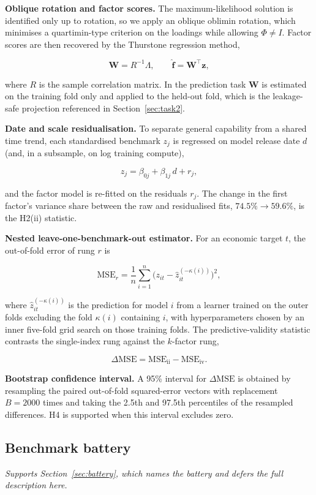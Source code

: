\medskip
\noindent\textbf{Oblique rotation and factor scores.}
The maximum-likelihood solution is identified only up to rotation, so we apply an oblique oblimin
rotation, which minimises a quartimin-type criterion on the loadings while allowing $\Phi\neq I$. Factor
scores are then recovered by the Thurstone regression method,

\[
  \mathbf{W} = R^{-1}\Lambda, \qquad \hat{\mathbf{f}} = \mathbf{W}^{\top}\mathbf{z},
\]

where $R$ is the sample correlation matrix. In the prediction task $\mathbf{W}$ is estimated on the
training fold only and applied to the held-out fold, which is the leakage-safe projection referenced in
Section~\ref{sec:task2}.\label{app:scores}

\medskip
\noindent\textbf{Date and scale residualisation.}
To separate general capability from a shared time trend, each standardised benchmark $z_j$ is regressed
on model release date $d$ (and, in a subsample, on log training compute),

\[
  z_j = \beta_{0j} + \beta_{1j}\, d + r_j ,
\]

and the factor model is re-fitted on the residuals $r_j$. The change in the first factor's variance
share between the raw and residualised fits, $74.5\%\rightarrow 59.6\%$, is the H2(ii) statistic.

\medskip
\noindent\textbf{Nested leave-one-benchmark-out estimator.}
For an economic target $t$, the out-of-fold error of rung $r$ is

\[
  \mathrm{MSE}_r = \frac{1}{n}\sum_{i=1}^{n}\bigl(z_{it} - \hat{z}_{it}^{(-\kappa(i))}\bigr)^{2},
\]

where $\hat{z}_{it}^{(-\kappa(i))}$ is the prediction for model $i$ from a learner trained on the outer
folds excluding the fold $\kappa(i)$ containing $i$, with hyperparameters chosen by an inner five-fold
grid search on those training folds. The predictive-validity statistic contrasts the single-index rung
against the $k$-factor rung,

\[
  \Delta\mathrm{MSE} = \mathrm{MSE}_{\text{ii}} - \mathrm{MSE}_{\text{iv}} .
\]

\medskip
\noindent\textbf{Bootstrap confidence interval.}
A 95\% interval for $\Delta\mathrm{MSE}$ is obtained by resampling the paired out-of-fold squared-error
vectors with replacement $B=2000$ times and taking the 2.5th and 97.5th percentiles of the resampled
differences. H4 is supported when this interval excludes zero.

\subsection{Benchmark battery}\label{app:battery}
\emph{Supports Section~\ref{sec:battery}, which names the battery and defers the full description here.}


